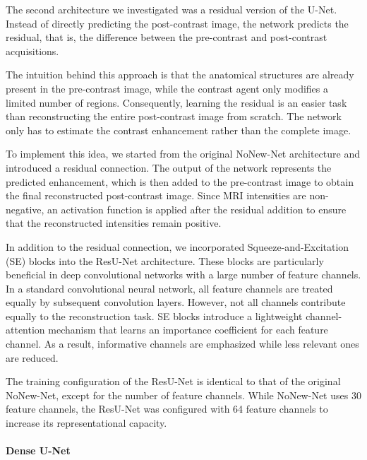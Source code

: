 \documentclass[12pt]{article}
\begin{document}
The second architecture we investigated was a residual version of the U-Net.
Instead of directly predicting the post-contrast image, the network predicts the residual, that is, the difference between the pre-contrast and post-contrast acquisitions.
\vspace{0.5cm}

The intuition behind this approach is that the anatomical structures are already present in the pre-contrast image, while the contrast agent only modifies a limited number of regions.
Consequently, learning the residual is an easier task than reconstructing the entire post-contrast image from scratch.
The network only has to estimate the contrast enhancement rather than the complete image.
\vspace{0.5cm}

To implement this idea, we started from the original NoNew-Net architecture and introduced a residual connection.
The output of the network represents the predicted enhancement, which is then added to the pre-contrast image to obtain the final reconstructed post-contrast image.
Since MRI intensities are non-negative, an activation function is applied after the residual addition to ensure that the reconstructed intensities remain positive.
\vspace{0.5cm}

In addition to the residual connection, we incorporated Squeeze-and-Excitation (SE) blocks into the ResU-Net architecture.
These blocks are particularly beneficial in deep convolutional networks with a large number of feature channels.
In a standard convolutional neural network, all feature channels are treated equally by subsequent convolution layers.
However, not all channels contribute equally to the reconstruction task.
SE blocks introduce a lightweight channel-attention mechanism that learns an importance coefficient for each feature channel.
As a result, informative channels are emphasized while less relevant ones are reduced.
\vspace{0.5cm}

The training configuration of the ResU-Net is identical to that of the original NoNew-Net, except for the number of feature channels.
While NoNew-Net uses 30 feature channels, the ResU-Net was configured with 64 feature channels to increase its representational capacity.


\paragraph{Dense U-Net}
\mbox{}\\
\end{document}
